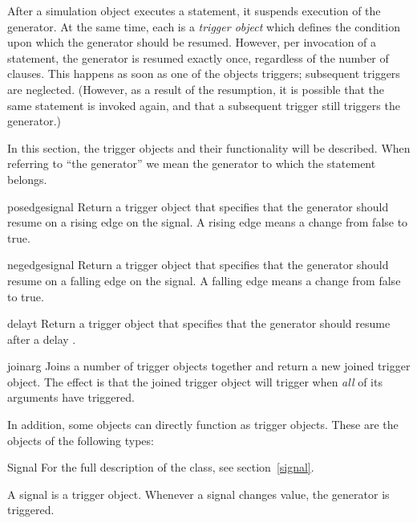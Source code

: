 \hspace{\leftmargin} 

After a simulation object executes a  statement, it
suspends execution of the generator. At the same time, each
 is a \emph{trigger object} which defines the condition
upon which the generator should be resumed. However, per invocation of a
 statement, the generator is resumed exactly once,
regardless of the number of clauses. This happens as soon as one
of the objects triggers; subsequent triggers are
neglected. (However, as a result of the resumption, it is possible
that the same  statement is invoked again, and that a
subsequent trigger still triggers the generator.)

In this section, the trigger objects and their functionality will be
described. When referring to ``the generator'' we mean the generator
to which the  statement belongs.

\begin{funcdesc}{posedge}{signal}
Return a trigger object that specifies that the generator should
resume on a rising edge on the signal. A rising edge means a change
from false to true.
\end{funcdesc}

\begin{funcdesc}{negedge}{signal}
Return a trigger object that specifies that the generator should
resume on a falling edge on the signal. A falling edge means a change
from false to true.
\end{funcdesc}

\begin{funcdesc}{delay}{t}
Return a trigger object that specifies that the generator should
resume after a delay .
\end{funcdesc}

\begin{funcdesc}{join}{arg }
Joins a number of trigger objects together and return a new joined
trigger object.  The effect is that the joined trigger object will
trigger when \emph{all} of its arguments have triggered.
\end{funcdesc}

In addition, some objects can directly function as trigger
objects. These are the objects of the following types:

\begin{datadesc}{Signal}
For the full description of the  class, see
section~\ref{signal}.

A signal is a trigger object. Whenever a signal changes value, the
generator is triggered.
\end{datadesc}


